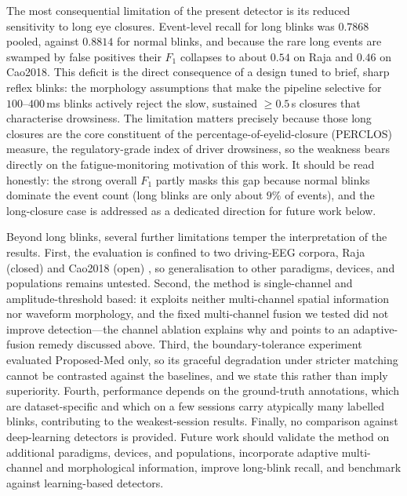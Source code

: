 The most consequential limitation of the present detector is its reduced sensitivity to long eye closures. Event-level recall for long blinks was $0.7868$ pooled, against $0.8814$ for normal blinks, and because the rare long events are swamped by false positives their $F_1$ collapses to about $0.54$ on Raja and $0.46$ on Cao2018. This deficit is the direct consequence of a design tuned to brief, sharp reflex blinks: the morphology assumptions that make the pipeline selective for $100$--$400$\,ms blinks actively reject the slow, sustained $\geq 0.5$\,s closures that characterise drowsiness. The limitation matters precisely because those long closures are the core constituent of the percentage-of-eyelid-closure (PERCLOS) measure, the regulatory-grade index of driver drowsiness, so the weakness bears directly on the fatigue-monitoring motivation of this work. It should be read honestly: the strong overall $F_1$ partly masks this gap because normal blinks dominate the event count (long blinks are only about $9\%$ of events), and the long-closure case is addressed as a dedicated direction for future work below.

Beyond long blinks, several further limitations temper the interpretation of the results. First, the evaluation is confined to two driving-EEG corpora, Raja (closed) and Cao2018 (open) \citep{cao2019multichannel}, so generalisation to other paradigms, devices, and populations remains untested. Second, the method is single-channel and amplitude-threshold based: it exploits neither multi-channel spatial information nor waveform morphology, and the fixed multi-channel fusion we tested did not improve detection---the channel ablation explains why and points to an adaptive-fusion remedy discussed above. Third, the boundary-tolerance experiment evaluated Proposed-Med only, so its graceful degradation under stricter matching cannot be contrasted against the baselines, and we state this rather than imply superiority. Fourth, performance depends on the ground-truth annotations, which are dataset-specific and which on a few sessions carry atypically many labelled blinks, contributing to the weakest-session results. Finally, no comparison against deep-learning detectors is provided. Future work should validate the method on additional paradigms, devices, and populations, incorporate adaptive multi-channel and morphological information, improve long-blink recall, and benchmark against learning-based detectors.
